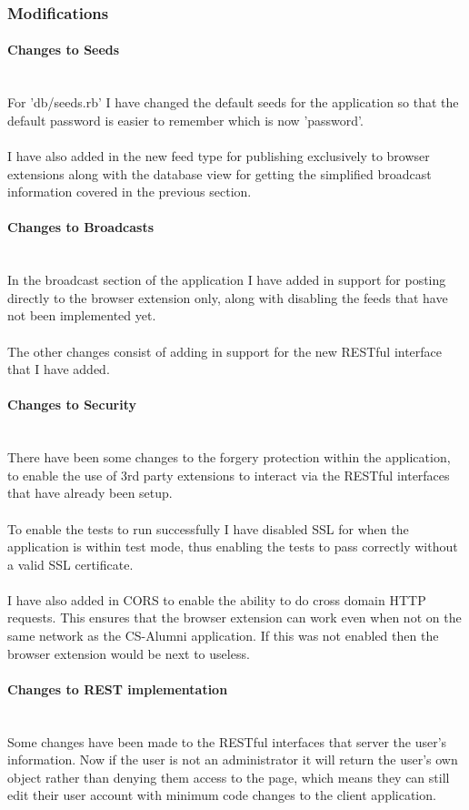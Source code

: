 \documentclass{article}
\newcommand{\myparagraph}[1]{\paragraph{#1}\mbox{}\\}
\begin{document}
\subsubsection{Modifications}

\myparagraph{Changes to Seeds}

For 'db/seeds.rb' I have changed the default seeds for the application so that the default password is easier to remember which is now 'password'.\\
\\
I have also added in the new feed type for publishing exclusively to browser extensions along with the database view for getting the simplified broadcast information covered in the previous section.

\myparagraph{Changes to Broadcasts}

In the broadcast section of the application I have added in support for posting directly to the browser extension only, along with disabling the feeds that have not been implemented yet.\\
\\
The other changes consist of adding in support for the new RESTful interface that I have added.

\myparagraph{Changes to Security}

There have been some changes to the forgery protection within the application, to enable the use of 3rd party extensions to interact via the RESTful interfaces that have already been setup.\\
\\
To enable the tests to run successfully I have disabled SSL for when the application is within test mode, thus enabling the tests to pass correctly without a valid SSL certificate.\\
\\
I have also added in CORS to enable the ability to do cross domain HTTP requests. This ensures that the browser extension can work even when not on the same network as the CS-Alumni application. If this was not enabled then the browser extension would be next to useless.

\myparagraph{Changes to REST implementation}

Some changes have been made to the RESTful interfaces that server the user's information. Now if the user is not an administrator it will return the user's own object rather than denying them access to the page, which means they can still edit their user account with minimum code changes to the client application. 
\end{document}
